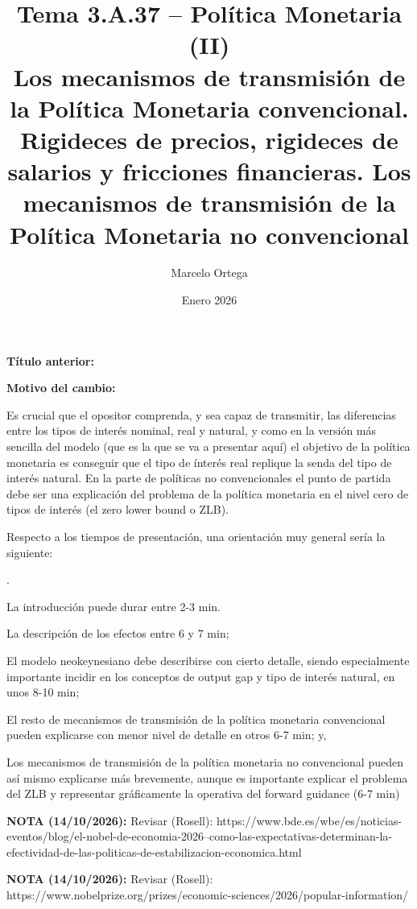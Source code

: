 \documentclass[10pt,a4paper]{article}
\title{Tema 3.A.37 -- Política Monetaria (II)\\
\large Los mecanismos de transmisión de la Política Monetaria convencional. Rigideces de precios, rigideces de salarios y fricciones financieras. Los mecanismos de transmisión de la Política Monetaria no convencional}
\author{Marcelo Ortega}
\date{Enero 2026}
\newcounter{numitem}
\newcommand{\puntosclave}[1]{%
  \begin{tcolorbox}[
    colframe=black,
    title={Puntos clave},
    before upper={\setlength{\parindent}{0.5cm}\setlength{\parskip}{0.5\baselineskip}}
  ]
  #1
  \end{tcolorbox}
}
\newcommand{\modificaciones}[1]{
  \begin{tcolorbox}[
    colback=white,
    colframe=red,
    title={Modificaciones a realizar},
    before upper={\setlength{\parindent}{0.5cm}\setlength{\parskip}{0.5\baselineskip}}
  ]
  #1
  \end{tcolorbox}
}
\newenvironment{lnum}
      {\begin{list}{\arabic{numitem}.}{%
          \usecounter{numitem}%
          \setlength{\leftmargin}{1cm}%
          \setlength{\parskip}{3pt}%
          \setlength{\itemsep}{0pt}%
          \setlength{\parsep}{0pt}%
      }}
      {\end{list}}
\newcommand{\changebox}{%
\begin{tcolorbox}[title={Historial de cambios del tema}]
\textbf{Título anterior:} \OldTitle\par
\textbf{Motivo del cambio:} \ChangeWhy
\end{tcolorbox}
}
\begin{document}
\maketitle
\changebox

\newpage

\puntosclave{ %
    Es crucial que el opositor comprenda, y sea capaz de transmitir, las diferencias entre los tipos de interés nominal, real y natural, y como en la versión más sencilla del modelo (que es la que se va a presentar aquí) el objetivo de la política monetaria es conseguir que el tipo de ínterés real replique la senda del tipo de interés natural. En la parte de políticas no convencionales el punto de partida debe ser una explicación del problema de la política monetaria en el nivel cero de tipos de interés (el zero lower bound o ZLB).

    Respecto a los tiempos de presentación, una orientación muy general sería la siguiente:
    \begin{lnum}
        \item La introducción puede durar entre 2-3 min. 
        \item La descripción de los efectos entre 6 y 7 min;
        \item El modelo neokeynesiano debe describirse con cierto detalle, siendo especialmente importante incidir en los conceptos de output gap y tipo de interés natural, en unos 8-10 min;
        \item El resto de mecanismos de transmisión de la política monetaria convencional pueden explicarse con menor nivel de detalle en otros 6-7 min; y,
        \item Los mecanismos de transmisión de la política monetaria no convencional pueden así mismo explicarse más brevemente, aunque es importante explicar el problema del ZLB y representar gráficamente la operativa del forward guidance (6-7 min)
    \end{lnum}
    }
\vspace{1cm}

\modificaciones{
    \textbf{NOTA (14/10/2026):} Revisar (Rosell): https://www.bde.es/wbe/es/noticias-eventos/blog/el-nobel-de-economia-2026--como-las-expectativas-determinan-la-efectividad-de-las-politicas-de-estabilizacion-economica.html

    \textbf{NOTA (14/10/2026):} Revisar (Rosell): https://www.nobelprize.org/prizes/economic-sciences/2026/popular-information/
}
\end{document}
